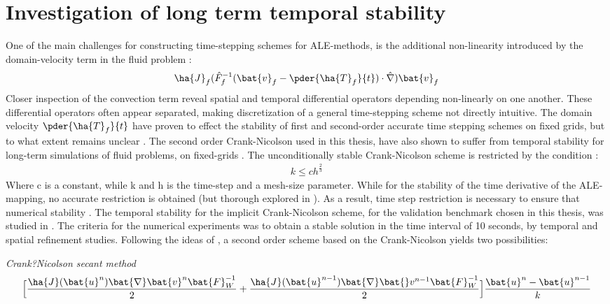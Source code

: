 \section{Investigation of long term temporal stability}
One of the main challenges for constructing time-stepping schemes for ALE-methods, is the additional non-linearity introduced by the domain-velocity term in the fluid problem \cite{Formaggia2004}:
\begin{align}
\ha{J}_f (\hat{F}_f^{-1}(\bat{v}_f - \pder{\ha{T}_f}{t}) \cdot \hat{\nabla}) \bat{v}_f
\end{align} 
Closer inspection of the convection term reveal spatial and temporal differential operators depending non-linearly on one another. These differential operators often appear separated, making discretization of a general time-stepping scheme not directly intuitive. The domain velocity $ \pder{\ha{T}_f}{t}$ have proven to effect the stability of first and second-order accurate time stepping schemes on fixed grids, but to what extent remains unclear  \cite{Formaggia2004, Formaggia1991}. The second order Crank-Nicolson used in this thesis, have also shown to suffer from temporal stability for long-term simulations of fluid problems, on fixed-grids \cite{Wick2013a}.
The  unconditionally stable Crank-Nicolson scheme is restricted by the condition \cite{Wick2013a}:
\begin{align}
k \leq ch^{\frac{2}{3}} 
\end{align}
Where c is a constant, while k and h is the time-step and a mesh-size parameter. While for the stability of the time derivative of the ALE-mapping, no accurate restriction is obtained (but thorough explored in \cite{Formaggia2004}). As a result, time step restriction is necessary to ensure that numerical stability  \cite{Formaggia2004}. The temporal stability for the implicit Crank-Nicolson scheme, for the validation benchmark chosen in this thesis, was studied in  \cite{Richter2015}. The criteria for the numerical experiments was to obtain a stable solution in the time interval of 10 seconds, by temporal and spatial refinement studies.  Following the ideas of \cite{Richter2015}, a second order scheme based on the Crank-Nicolson yields two possibilities:
\begin{discr}
\textit{Crank?Nicolson secant method }
\begin{align*}
\Big[\frac{\ha{J}(\bat{u}^{n}) \bat{\nabla} \bat{v}^{n} \bat{F}_W^{-1}}{2} 
+ \frac{\ha{J}(\bat{u}^{n-1}) \bat{\nabla} \bat{}v^{n-1} \bat{F}_W^{-1}}{2} \Big] 
\frac{\bat{u}^{n} - \bat{u}^{n-1}}{k}
\end{align*} 
\label{eq:cn1}
\end{discr}
